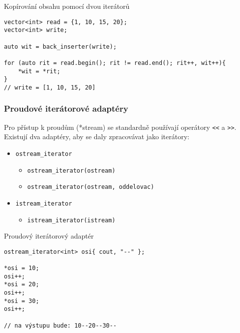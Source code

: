 \begin{frame}[fragile]
\begin{exampleblock}{{\YES} Kopírování obsahu pomocí dvou iterátorů}
\begin{lstlisting}
vector<int> read = {1, 10, 15, 20};
vector<int> write;

auto wit = back_inserter(write);

for (auto rit = read.begin(); rit != read.end(); rit++, wit++){
	*wit = *rit;
}
// write = [1, 10, 15, 20]
\end{lstlisting}
\end{exampleblock}	
\end{frame}


\begin{frame}[fragile]
\frametitle{Proudové iterátorové adaptéry}
\begin{block}{}
Pro přístup k proudům (*stream) se standardně používají operátory \lstinline|<<| a \lstinline|>>|. Existují dva adaptéry, aby se daly zpracovávat jako iterátory:

\begin{itemize}
\item \lstinline|ostream_iterator|
\begin{itemize}
\item  \lstinline|ostream_iterator(ostream)|
\item  \lstinline|ostream_iterator(ostream, oddelovac)|		
\end{itemize}
\item \lstinline|istream_iterator|
\begin{itemize}
\item \lstinline|istream_iterator(istream)|
\end{itemize}

\end{itemize}

\end{block}
\end{frame}


\begin{frame}[fragile]
\begin{exampleblock}{{\YES} Proudový iterátorový adaptér}
\begin{lstlisting}
ostream_iterator<int> osi{ cout, "--" };

*osi = 10;
osi++;
*osi = 20;
osi++;
*osi = 30;
osi++;

// na výstupu bude: 10--20--30--
\end{lstlisting}
\end{exampleblock}	
\end{frame}



